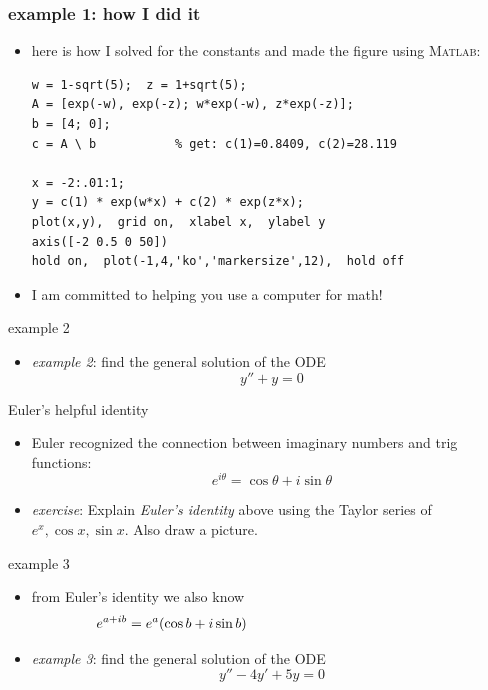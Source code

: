 \documentclass{beamer}
\newcommand{\Matlab}{\textsc{Matlab}}
\begin{document}
\begin{frame}[fragile]
\frametitle{example 1: how I did it}

\begin{itemize}
\item here is how I solved for the constants and made the figure using \Matlab:

\bigskip
\begin{Verbatim}[fontsize=\small]
w = 1-sqrt(5);  z = 1+sqrt(5);
A = [exp(-w), exp(-z); w*exp(-w), z*exp(-z)];
b = [4; 0];
c = A \ b           % get: c(1)=0.8409, c(2)=28.119

x = -2:.01:1;
y = c(1) * exp(w*x) + c(2) * exp(z*x); 
plot(x,y),  grid on,  xlabel x,  ylabel y
axis([-2 0.5 0 50])
hold on,  plot(-1,4,'ko','markersize',12),  hold off
\end{Verbatim}

\bigskip
\item I am committed to helping you use a computer for math!

\end{itemize}
\end{frame}


\begin{frame}{example 2}

\begin{itemize}
\item \emph{example 2}: find the general solution of the ODE
    $$y'' + y = 0$$
\end{itemize}

\vspace{55mm}
\end{frame}


\begin{frame}{Euler's helpful identity}

\begin{itemize}
\item Euler recognized the connection between imaginary numbers and trig functions:
    $$e^{i\theta} = \cos\theta + i \sin\theta$$
\item \emph{exercise}: Explain \emph{Euler's identity} above using the Taylor series of $e^x,\cos x,\sin x$.  Also draw a picture.
\end{itemize}

\vspace{50mm}
\end{frame}


\begin{frame}{example 3}

\begin{itemize}
\item from Euler's identity we also know
    $$e^{a+ib} = e^a(\cos b + i \sin b) \hspace{50mm}$$
\item \emph{example 3}: find the general solution of the ODE
    $$y''-4y'+5y=0$$
\end{itemize}

\vspace{50mm}
\end{frame}
\end{document}
